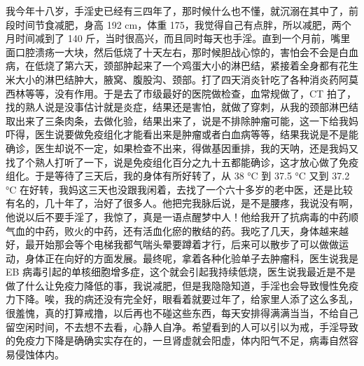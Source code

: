\begin{case}
    我今年十八岁，手淫史已经有三四年了，那时候什么也不懂，就沉溺在其中了，前段时间节食减肥，身高 192 \unit{\cm}，体重 175，我觉得自己有点胖，所以减肥，两个月时间减到了 140 斤，当时很高兴，而且同时每天也手淫。直到一个月前，嘴里面口腔溃疡一大块，然后低烧了十天左右，那时候胆战心惊的，害怕会不会是白血病，在低烧了第六天，颈部肿起来了一个鸡蛋大小的淋巴结，紧接着全身都有花生米大小的淋巴结肿大，腋窝、腹股沟、颈部。打了四天消炎针吃了各种消炎药阿莫西林等等，没有作用。于是去了市级最好的医院做检查，血常规做了，CT 拍了，找的熟人说是没事估计就是炎症，结果还是害怕，就做了穿刺，从我的颈部淋巴结取出来了三条肉条，去做化验，结果出来了，说是不排除肿瘤可能，这一下给我妈吓得，医生说要做免疫组化才能看出来是肿瘤或者白血病等等，结果我说是不是能确诊，医生却说不一定，如果检查不出来，得做基因重排，我的天呐，还是我妈又找了个熟人打听了一下，说是免疫组化百分之九十五都能确诊，这才放心做了免疫组化。于是等待了三天后，我的身体有所好转了，从 38 \unit{\degreeCelsius} 到 37.5 \unit{\degreeCelsius} 又到 37.2 \unit{\degreeCelsius} 在好转，我妈这三天也没跟我闲着，去找了一个六十多岁的老中医，还是比较有名的，几十年了，治好了很多人。他把完我脉后说，是不是腰疼，我说没有啊，他说以后不要手淫了，我惊了，真是一语点醒梦中人！他给我开了抗病毒的中药顺气血的中药，败火的中药，还有活血化瘀的散结的药。我吃了几天，身体越来越好，最开始那会等个电梯我都气喘头晕要蹲着才行，后来可以散步了可以做做运动，身体正在向好的方面发展。最终呢，拿着各种化验单子去肿瘤科，医生说我是 EB 病毒引起的单核细胞增多症，这个就会引起我持续低烧，医生说我最近是不是做了什么让免疫力降低的事，我说减肥，但是我隐隐知道，手淫也会导致慢性免疫力下降。唉，我的病还没有完全好，眼看着就要过年了，给家里人添了这么多乱，很羞愧，真的打算戒撸，以后再也不碰这些东西，每天安排得满满当当，不给自己留空闲时间，不去想不去看，心静人自净。希望看到的人可以引以为戒，手淫导致的免疫力下降是确确实实存在的，一旦肾虚就会阳虚，体内阳气不足，病毒自然容易侵蚀体内。


\end{case}
